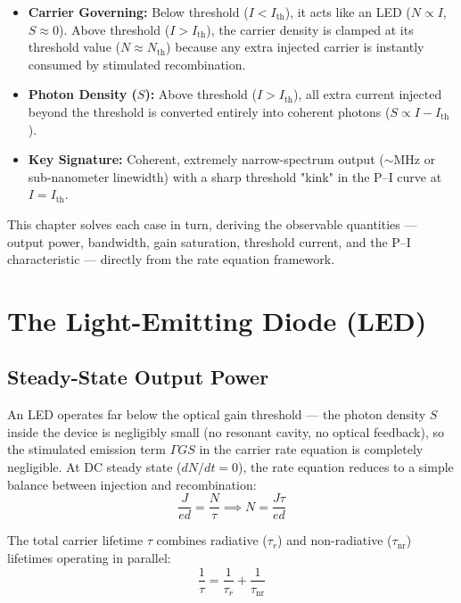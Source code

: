 \begin{itemize}
\begin{itemize}
        \item \textbf{Carrier Governing:} Below threshold ($I < I_{\text{th}}$), it acts like an LED ($N \propto I$, $S \approx 0$). Above threshold ($I > I_{\text{th}}$), the carrier density is clamped at its threshold value ($N \approx N_{\text{th}}$) because any extra injected carrier is instantly consumed by stimulated recombination.
        \item \textbf{Photon Density ($S$):} Above threshold ($I > I_{\text{th}}$), all extra current injected beyond the threshold is converted entirely into coherent photons ($S \propto I - I_\text{th}$).
        \item \textbf{Key Signature:} Coherent, extremely narrow-spectrum output ($\sim\text{MHz}$ or sub-nanometer linewidth) with a sharp threshold "kink" in the P--I curve at $I = I_{\text{th}}$.
    \end{itemize}
\end{itemize}

This chapter solves each case in turn, deriving the observable quantities — output power, bandwidth, gain saturation, threshold current, and the P--I characteristic — directly from the rate equation framework.

\section{The Light-Emitting Diode (LED)}

\subsection{Steady-State Output Power}

An LED operates far below the optical gain threshold — the photon density $S$ inside the device is negligibly small (no resonant cavity, no optical feedback), so the stimulated emission term $\Gamma G S$ in the carrier rate equation is completely negligible. At DC steady state ($dN/dt = 0$), the rate equation reduces to a simple balance between injection and recombination:
\begin{equation*}
    \frac{J}{ed} = \frac{N}{\tau} \implies N = \frac{J\tau}{ed}
\end{equation*}

The total carrier lifetime $\tau$ combines radiative ($\tau_r$) and non-radiative ($\tau_{\text{nr}}$) lifetimes operating in parallel:
\begin{equation*}
    \frac{1}{\tau} = \frac{1}{\tau_r} + \frac{1}{\tau_{\text{nr}}}
\end{equation*}

